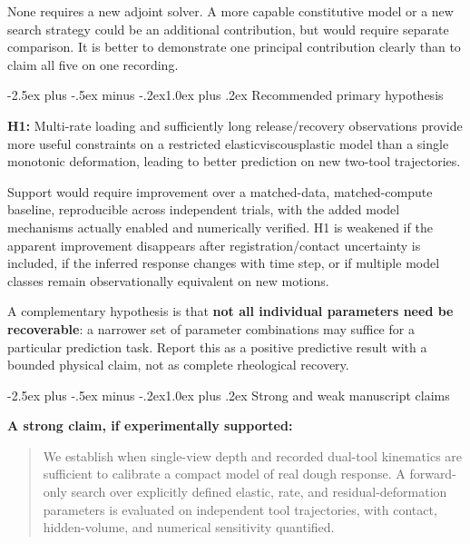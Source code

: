 \documentclass[
  11pt,
]{article}
\makeatletter
\renewcommand\subsection{\needspace{5\baselineskip}\@startsection{subsection}{2}{\z@}%
  {-2.5ex plus -.5ex minus -.2ex}{1.0ex plus .2ex}%
  {\normalfont\sffamily\large\bfseries\color{accent}}}
\makeatother
\begin{document}
None requires a new adjoint solver. A more capable constitutive model or
a new search strategy could be an additional contribution, but would
require separate comparison. It is better to demonstrate one principal
contribution clearly than to claim all five on one recording.

\subsection{Recommended primary
hypothesis}\label{recommended-primary-hypothesis}

\textbf{H1:} Multi-rate loading and sufficiently long release/recovery
observations provide more useful constraints on a restricted
elastic\textendash{}\allowbreak{}viscous\textendash{}\allowbreak{}plastic
model than a single monotonic deformation, leading to better prediction
on new two-tool trajectories.

Support would require improvement over a matched-data, matched-compute
baseline, reproducible across independent trials, with the added model
mechanisms actually enabled and numerically verified. H1 is weakened if
the apparent improvement disappears after registration/contact
uncertainty is included, if the inferred response changes with time
step, or if multiple model classes remain observationally equivalent on
new motions.

A complementary hypothesis is that \textbf{not all individual parameters
need be recoverable}: a narrower set of parameter combinations may
suffice for a particular prediction task. Report this as a positive
predictive result with a bounded physical claim, not as complete
rheological recovery.

\subsection{Strong and weak manuscript
claims}\label{strong-and-weak-manuscript-claims}

\textbf{A strong claim, if experimentally supported:}

\begin{quote}
We establish when single-view depth and recorded dual-tool kinematics
are sufficient to calibrate a compact model of real dough response. A
forward-only search over explicitly defined elastic, rate, and
residual-deformation parameters is evaluated on independent tool
trajectories, with contact, hidden-volume, and numerical sensitivity
quantified.
\end{quote}
\end{document}
